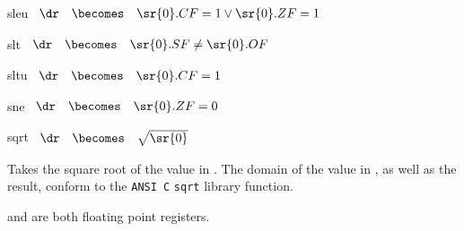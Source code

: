 \begin{instruction}{sleu}
     {\sleuopc}
     {
       \begin{math}
         \begin{array}{lcl}
           \dr & \becomes & \sr{0}.CF = 1 \vee \sr{0}.ZF = 1 \\
         \end{array}
       \end{math}
     }
\end{instruction}


\begin{instruction}{slt}
     {\sltopc}
     {
       \begin{math}
         \begin{array}{lcl}
           \dr & \becomes & \sr{0}.SF \neq \sr{0}.OF \\
         \end{array}
       \end{math}
     }
\end{instruction}

\begin{instruction}{sltu}
     {\sltuopc}
     {
       \begin{math}
         \begin{array}{lcl}
           \dr & \becomes & \sr{0}.CF = 1 \\
         \end{array}
       \end{math}
     }
\end{instruction}

\begin{instruction}{sne}
     {\sneopc}
     {
       \begin{math}
         \begin{array}{lcl}
           \dr & \becomes & \sr{0}.ZF = 0 \\
         \end{array}
       \end{math}
     }
\end{instruction}


\begin{instruction}{sqrt}
     {\sqrtopc}
     {
       \begin{math}
         \begin{array}{lcl}
           \dr & \becomes & \sqrt{\sr{0}}
         \end{array}
       \end{math}
     }
     {Takes the square root of the value in .  The domain of the value
     in \texttt{}, as well as the result, conform to
     the \texttt{ANSI C} \texttt{sqrt} library function.

      and \dr are both floating point registers.}
\end{instruction}


